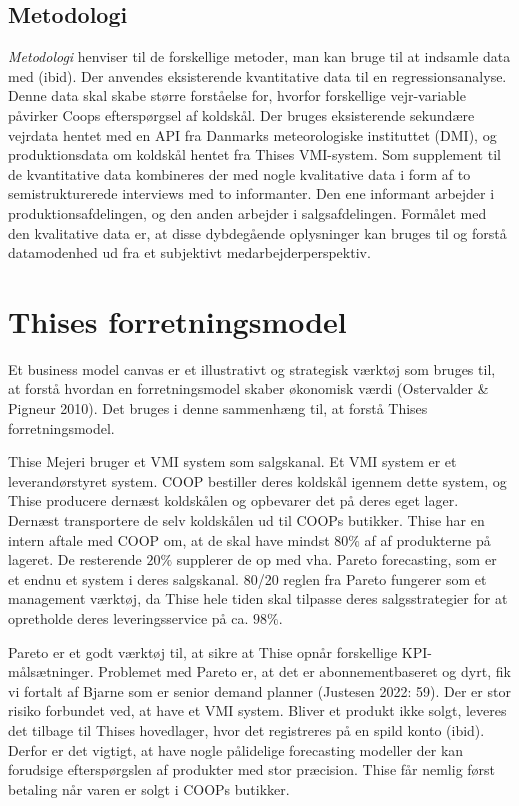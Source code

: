 \documentclass[
  12pt,
  a4paper,
  DIV=11,
  numbers=noendperiod,
  oneside,
  open=any]{scrartcl}
\begin{document}
\hypertarget{metodologi}{%
\subsection{Metodologi}\label{metodologi}}

\emph{Metodologi} henviser til de forskellige metoder, man kan bruge til
at indsamle data med (ibid). Der anvendes eksisterende kvantitative data
til en regressionsanalyse. Denne data skal skabe større forståelse for,
hvorfor forskellige vejr-variable påvirker Coops efterspørgsel af
koldskål. Der bruges eksisterende sekundære vejrdata hentet med en API
fra Danmarks meteorologiske instituttet (DMI), og produktionsdata om
koldskål hentet fra Thises VMI-system. Som supplement til de
kvantitative data kombineres der med nogle kvalitative data i form af to
semistrukturerede interviews med to informanter. Den ene informant
arbejder i produktionsafdelingen, og den anden arbejder i
salgsafdelingen. Formålet med den kvalitative data er, at disse
dybdegående oplysninger kan bruges til og forstå datamodenhed ud fra et
subjektivt medarbejderperspektiv.

\hypertarget{thises-forretningsmodel}{%
\section{Thises forretningsmodel}\label{thises-forretningsmodel}}

Et business model canvas er et illustrativt og strategisk værktøj som
bruges til, at forstå hvordan en forretningsmodel skaber økonomisk værdi
(Ostervalder \& Pigneur 2010). Det bruges i denne sammenhæng til, at
forstå Thises forretningsmodel.

Thise Mejeri bruger et VMI system som salgskanal. Et VMI system er et
leverandørstyret system. COOP bestiller deres koldskål igennem dette
system, og Thise producere dernæst koldskålen og opbevarer det på deres
eget lager. Dernæst transportere de selv koldskålen ud til COOPs
butikker. Thise har en intern aftale med COOP om, at de skal have mindst
\(80\%\) af af produkterne på lageret. De resterende \(20\%\) supplerer
de op med vha. Pareto forecasting, som er et endnu et system i deres
salgskanal. 80/20 reglen fra Pareto fungerer som et management værktøj,
da Thise hele tiden skal tilpasse deres salgsstrategier for at
opretholde deres leveringsservice på ca. \(98\%\).

Pareto er et godt værktøj til, at sikre at Thise opnår forskellige
KPI-målsætninger. Problemet med Pareto er, at det er abonnementbaseret
og dyrt, fik vi fortalt af Bjarne som er senior demand planner (Justesen
2022: 59). Der er stor risiko forbundet ved, at have et VMI system.
Bliver et produkt ikke solgt, leveres det tilbage til Thises hovedlager,
hvor det registreres på en spild konto (ibid). Derfor er det vigtigt, at
have nogle pålidelige forecasting modeller der kan forudsige
efterspørgslen af produkter med stor præcision. Thise får nemlig først
betaling når varen er solgt i COOPs butikker.
\end{document}
